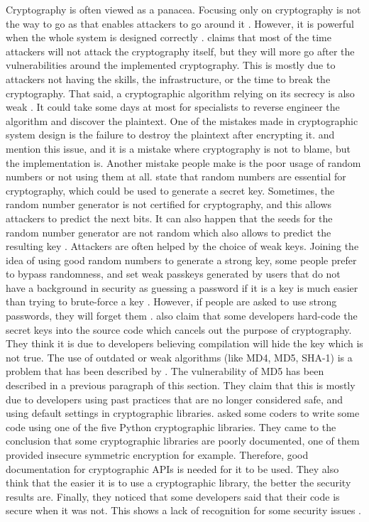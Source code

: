 \documentclass{l4proj}
\begin{document}
Cryptography is often viewed as a panacea. Focusing only on cryptography is not the way to go as that enables attackers to go around it \citep{schneier_security_1998}.
However, it is powerful when the whole system is designed correctly \citep{schneier_security_1998}. 
\citet{schneier_security_1998} claims that most of the time attackers will not attack the cryptography itself, but they will more go after the vulnerabilities around the
implemented cryptography. This is mostly due to attackers not having the skills, the infrastructure, or the time to break the cryptography. 
That said, a cryptographic algorithm relying on its secrecy is also weak \citep{schneier_security_1998}. It could take some days at most for specialists to reverse engineer 
the algorithm and discover the plaintext. One of the mistakes made in cryptographic system design is the failure to destroy the plaintext after encrypting it. 
\citet{schneier_security_1998} and \citet{lazar_why_2014} mention this issue, and it is a mistake where cryptography is not to blame, but the implementation is.
Another mistake people make is the poor usage of random numbers or not using them at all. \citet{lazar_why_2014} state that random numbers are essential for cryptography, 
which could be used to generate a secret key. Sometimes, the random number generator is not certified for cryptography, and this allows attackers to predict the next bits.
It can also happen that the seeds for the random number generator are not random which also allows to predict the resulting key \citep{lazar_why_2014}.
Attackers are often helped by the choice of weak keys. Joining the idea of using good random numbers to generate a strong key, some people prefer to bypass randomness,
and set weak passkeys generated by users that do not have a background in security as guessing a password if it is a key is much easier than trying to brute-force a key \citep{schneier_security_1998}.
However, if people are asked to use strong passwords, they will forget them \citep{schneier_security_1998}.
\citet{lazar_why_2014} also claim that some developers hard-code the secret keys into the source code which cancels out the purpose of cryptography.
They think it is due to developers believing compilation will hide the key which is not true.
The use of outdated or weak algorithms (like MD4, MD5, SHA-1) is a problem that has been described by \citet{lazar_why_2014}.
The vulnerability of MD5 has been described in a previous paragraph of this section.
They claim that this is mostly due to developers using past practices that are no longer considered safe, and using default settings in cryptographic libraries.
\citet{acar_comparing_2017} asked some coders to write some code using one of the five Python cryptographic libraries.
They came to the conclusion that some cryptographic libraries are poorly documented, one of them provided insecure symmetric encryption for example.
Therefore, good documentation for cryptographic APIs is needed for it to be used.
They also think that the easier it is to use a cryptographic library, the better the security results are.
Finally, they noticed that some developers said that their code is secure when it was not. This shows a lack of recognition for some security issues \citep{lazar_why_2014}.
\end{document}
